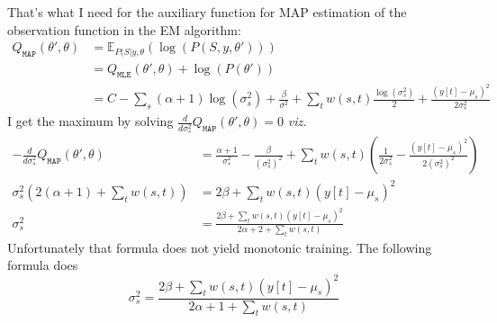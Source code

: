 \documentclass{article}
\newcommand{\parameters}{\theta}
\newcommand{\parametersPrime}{\theta'}
\newcommand{\qmle}{Q_{\mathtt{MLE}}(\parametersPrime, \parameters)}
\newcommand{\qmap}{Q_{\mathtt{MAP}}(\parametersPrime, \parameters)}
\newcommand{\field}[1]{\mathbb{#1}}
\newcommand{\EV}{\field{E}}
\begin{document}
That's what I need for the auxiliary function for MAP estimation of
the observation function in the EM algorithm:
\begin{align*}
  \qmap &= \EV_{P(S|y,\parameters} \left( \log \left (
          P\left (S,y,\parametersPrime \right) \right) \right) \\
        &= \qmle + \log \left( P \left(\parametersPrime \right) \right)  \\
        &= C -\sum_s (\alpha + 1 ) \log(\sigma_s^2) +
          \frac{\beta}{\sigma^2} + \sum_t w(s,t)
          \frac{\log(\sigma_s^2)}{2} + \frac{(y[t] - \mu_s)^2}{2 \sigma_s^2}
\end{align*}
I get the maximum by solving $\frac{d}{d \sigma_s^2} \qmap = 0$
\emph{viz.}
\begin{align*}
  - \frac{d}{d \sigma_s^2} \qmap &= \frac{\alpha + 1}{\sigma_s^2} -
                                   \frac{\beta}{(\sigma_s^2)^2} +
                                   \sum_t w(s,t) \left(
                                   \frac{1}{2\sigma_s^2} - \frac{(y[t]
                                   - \mu_s)^2}{2(\sigma_s^2)^2}
                                   \right) \\
  \sigma_s^2\left(2(\alpha + 1) + \sum_t w(s,t) \right) &= 2\beta +
  \sum_t w(s,t) (y[t] - \mu_s)^2 \\
  \sigma_s^2 &= \frac{2 \beta + \sum_t w(s,t) (y[t] -
               \mu_s)^2}{2\alpha + 2 + \sum_t w(s,t)}
\end{align*}
Unfortunately that formula does not yield monotonic training.  The
following formula does
\begin{equation}
  \label{eq:hack}
  \sigma_s^2 = \frac{2 \beta + \sum_t w(s,t) (y[t] -
               \mu_s)^2}{2\alpha + 1 + \sum_t w(s,t)}
\end{equation}
\end{document}
